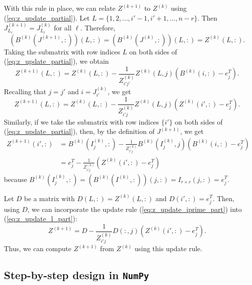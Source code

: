 \documentclass{article}
\begin{document}
	With this rule in place, we can relate $Z^{(k+1)}$ to $Z^{(k)}$ using (\ref{eq:z_update_partial}). Let $L = \{1,2,\dots, i'-1,i'+1,\dots,n-r\}$. Then $J^{(k+1)}_{L_\ell} = J^{(k)}_{L_\ell}$ for all $\ell$. Therefore,
	\begin{equation}
		\left(B^{(k)}\left(J^{(k+1)},:\right)\right)\left(L,:\right) = \left(B^{(k)}\left(J^{(k)}, :\right)\right)\left(L, :\right) = Z^{(k)}(L,:).
	\end{equation}
	Taking the submatrix with row indices $L$ on both sides of (\ref{eq:z_update_partial}), we obtain
	\begin{equation}
		Z^{(k+1)}(L,:) = Z^{(k)}(L, :) - \frac{1}{Z^{(k)}_{i'j'}}Z^{(k)}(L, j)\left(B^{(k)}(i,:) - e_j^T\right).
	\end{equation}
	Recalling that $j = j'$ and $i = J^{(k)}_{i'}$, we get
	\begin{equation}
		\label{eq:z_update_l_part}
		Z^{(k+1)}(L,:) = Z^{(k)}(L, :) - \frac{1}{Z^{(k)}_{i'j}}Z^{(k)}(L, j)\left(Z^{(k)}(i',:) - e_j^T\right).
	\end{equation}
	Similarly, if we take the submatrix with row indices $\{i'\}$ on both sides of (\ref{eq:z_update_partial}), then, by the definition of $J^{(k+1)}$, we get
	\begin{align}
		Z^{(k+1)}(i', :) &= B^{(k)}\left(I^{(k)}_j,:\right) - \frac{1}{Z^{(k)}_{i'j}}B^{(k)}\left(I^{(k)}_j, j\right)\left(B^{(k)}(i,:) - e_j^T\right) \\
		\label{eq:z_update_iprime_part}
		&= e_j^T - \frac{1}{Z^{(k)}_{i'j}}\left(Z^{(k)}(i',:) - e_j^T\right)
	\end{align}
	because $B^{(k)}\left(I^{(k)}_j, :\right) = \left(B^{(k)}\left(I^{(k)}, :\right)\right)(j,:) = I_{r\times r}(j,:) = e_j^T$.
	
	Let $D$ be a matrix with $D(L,:) = Z^{(k)}(L,:)$ and $D(i',:) = e_j^T$. Then, using $D$, we can incorporate the update rule (\ref{eq:z_update_iprime_part}) into (\ref{eq:z_update_l_part}):
	\begin{equation}
		\label{eq:z_update_full}
		Z^{(k+1)} = D - \frac{1}{Z^{(k)}_{i'j}}D(:, j)\left(Z^{(k)}(i',:) - e_j^T\right).
	\end{equation}
	Thus, we can compute $Z^{(k+1)}$ from $Z^{(k)}$ using this update rule.
	
	\subsection{Step-by-step design in \texttt{NumPy}}
	\lstset{language=python, numbers=left, frame=single, basicstyle=\small\ttfamily, showstringspaces=false}
	
\end{document}

